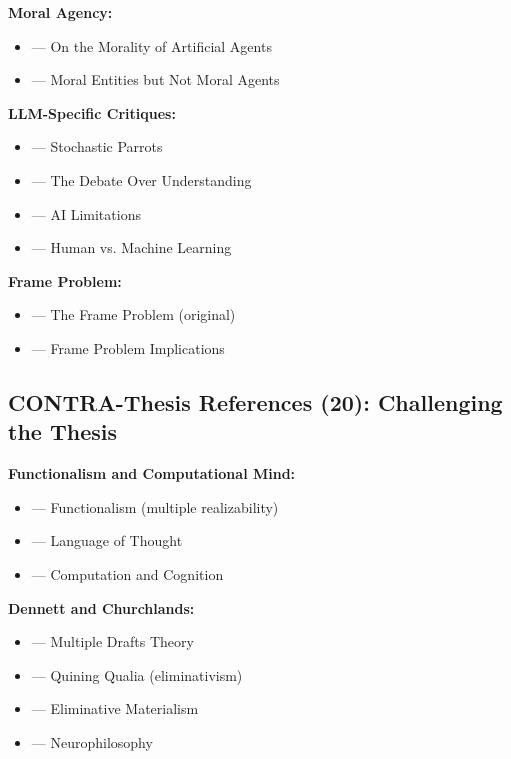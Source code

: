 \textbf{Moral Agency:}
\begin{itemize}[nosep]
    \item \citet{PAP-floridi2004morality} --- On the Morality of Artificial Agents
    \item \citet{PAP-johnson2006computer} --- Moral Entities but Not Moral Agents
\end{itemize}

\textbf{LLM-Specific Critiques:}
\begin{itemize}[nosep]
    \item \citet{PAP-bender2021dangers} --- Stochastic Parrots
    \item \citet{PAP-mitchell2023debate} --- The Debate Over Understanding
    \item \citet{PAP-marcus2020next} --- AI Limitations
    \item \citet{PAP-lake2017building} --- Human vs. Machine Learning
\end{itemize}

\textbf{Frame Problem:}
\begin{itemize}[nosep]
    \item \citet{PAP-mccarthy1981some} --- The Frame Problem (original)
    \item \citet{PAP-fodor1987modules} --- Frame Problem Implications
\end{itemize}


\subsection{CONTRA-Thesis References (20): Challenging the Thesis}

\textbf{Functionalism and Computational Mind:}
\begin{itemize}[nosep]
    \item \citet{PAP-putnam1967psychological} --- Functionalism (multiple realizability)
    \item \citet{PAP-fodor1975language} --- Language of Thought
    \item \citet{PAP-pylyshyn1984computation} --- Computation and Cognition
\end{itemize}

\textbf{Dennett and Churchlands:}
\begin{itemize}[nosep]
    \item \citet{PAP-dennett1991consciousness} --- Multiple Drafts Theory
    \item \citet{PAP-dennett1988quining} --- Quining Qualia (eliminativism)
    \item \citet{PAP-churchland1981eliminative} --- Eliminative Materialism
    \item \citet{PAP-churchland1986neurophilosophy} --- Neurophilosophy
\end{itemize}

